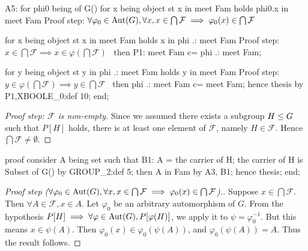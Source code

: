   A5: for phi0 being  of G()
  for x being object st x in meet Fam
  holds phi0.x in meet Fam
  \LA{}Proof step: $\forall\varphi_{0}\in\operatorname{Aut}(G),\forall x, x\in\bigcap\mathcal{F}\implies\varphi_{0}(x)\in\bigcap\mathcal{F}$~{\nwtagstyle{}}\RA{}

  for x being object st x in meet Fam
  holds x in phi .: meet Fam
  \LA{}Proof step: $x\in\bigcap\mathcal{F}\implies x\in\varphi(\bigcap\mathcal{F})$~{\nwtagstyle{}}\RA{}
  then P1: meet Fam c= phi .: meet Fam;

  for y being object st y in phi .: meet Fam
  holds y in meet Fam
  \LA{}Proof step: $y\in\varphi(\bigcap\mathcal{F})\implies y\in\bigcap\mathcal{F}$~{\nwtagstyle{}}\RA{}
  then phi .: meet Fam c= meet Fam;
  hence thesis by P1,XBOOLE_0:def 10;
end;
\eatline
{}\nwendcode{}\nwdocspar
\begin{proof}[Proof step: $\mathcal{F}$ is non-empty]
Since we assumed there exists a subgroup $H\leq G$ such that $P[H]$
holds, there is at least one element of $\mathcal{F}$, namely
$H\in\mathcal{F}$. Hence $\bigcap\mathcal{F}\neq\emptyset$.
\end{proof}

\nwenddocs{}\endmoddef\nwstartdeflinemarkup{}\nwenddeflinemarkup
proof
  consider A being set such that
  B1: A = the carrier of H;
  the carrier of H is Subset of G() by GROUP_2:def 5;
  then A in Fam by A3, B1;
  hence thesis;
end;
\nwendcode{}\nwdocspar

\begin{proof}[Proof step ($\forall\varphi_{0}\in\operatorname{Aut}(G),\forall x, x\in\bigcap\mathcal{F}\implies\varphi_{0}(x)\in\bigcap\mathcal{F}$).]
Suppose $x\in\bigcap\mathcal{F}$. Then $\forall A\in\mathcal{F},x\in A$.
Let $\varphi_{0}$ be an arbitrary automorphism of $G$.
From the hypothesis $P[H]\implies \forall\varphi\in\operatorname{Aut}(G),
P[\varphi(H)]$, we apply it to $\psi=\varphi_{0}^{-1}$. But this means $x\in\psi(A)$.
Then $\varphi_{0}(x)\in\varphi_{0}(\psi(A))$, and $\varphi_{0}(\psi(A))=A$. Thus the
result follows.
\end{proof}

